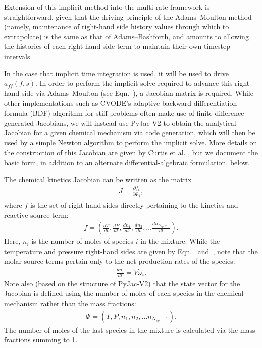 Extension of this implicit method into the multi-rate framework is
straightforward, given that the driving principle of the Adams--Moulton
method (namely, maintenance of right-hand side history values through
which to extrapolate) is the same as that of Adams--Bashforth, and amounts to
allowing the histories of each right-hand side term to maintain their
own timestep intervals.

In the case that implicit time integration is used, it will be used
to drive $a_{ff}(f,s)$. In order to perform the implicit solve required
to advance this right-hand side via Adams--Moulton (see Eqn.~), a Jacobian matrix
is required. While other implementations such as CVODE's adaptive backward differentiation formula (BDF)
algorithm for stiff problems often make use of finite-difference generated
Jacobians, we will instead use PyJac-V2 \cite{curtis2018using} to obtain the analytical Jacobian
for a given chemical mechanism via code generation, which will then
be used by a simple Newton algorithm to perform the implicit solve. More
details on the construction of this Jacobian are given by Curtis et al. \cite{curtis2018using}, but we
document the basic form, in addition to an alternate differential-algebraic
formulation, below.

The chemical kinetics Jacobian can be written as the matrix
\begin{align}
J = \frac{\partial f_{i}}{\partial \Phi_{j}}, \label{eq:jac}
\end{align}
where $f$ is the set of right-hand sides directly pertaining
to the kinetics and reactive source term:
\begin{align}
f = \left(\frac{dT}{dt}, \frac{dP}{dt}, \frac{dn_{1}}{dt}, \frac{dn_{2}}{dt}, \hdots \frac{dn_{N_{sp}-1}}{dt} \right).
\end{align}
Here, $n_{i}$ is the number of moles of species $i$ in the mixture.
While the temperature and pressure right-hand sides are given by Eqn.~ and~,
note that the molar source terms pertain only to the net production rates of the species:
\begin{align}
\frac{dn_{i}}{dt} = V \dot{\omega}_{i}.
\end{align}
Note also (based on the structure of PyJac-V2) that the state vector for the
Jacobian is defined using the number of moles of each species in the chemical
mechanism rather than the mass fractions:
\begin{align}
\Phi = \left(T, P, n_{1}, n_{2}, \hdots n_{N_{sp}-1}\right).
\end{align}
The number of moles of the last species in the mixture is calculated
via the mass fractions summing to 1.

